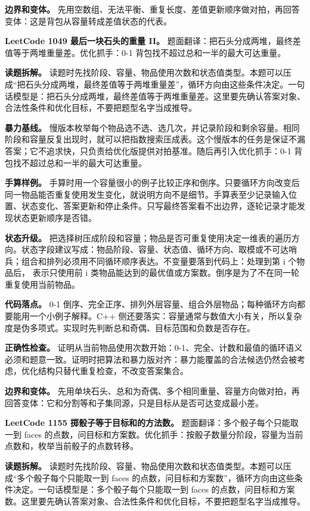 \textbf{边界和变体。} 先用空数组、无法平衡、重复长度、差值更新顺序做对拍，再回答变体：这是背包从容量转成差值状态的代表。

\noindent\textbf{LeetCode 1049 最后一块石头的重量 II。} 题面翻译：把石头分成两堆，最终差值等于两堆重量差。优化抓手：0-1 背包找不超过总和一半的最大可达重量。

\textbf{读题拆解。} 读题时先找阶段、容量、物品使用次数和状态值类型。本题可以压成“把石头分成两堆，最终差值等于两堆重量差”，循环方向由这些条件决定。一句话模型是：把石头分成两堆，最终差值等于两堆重量差。这里要先确认答案对象、合法性条件和优化目标，不要把题型名字当成推导。

\textbf{暴力基线。} 慢版本枚举每个物品选不选、选几次，并记录阶段和剩余容量。相同阶段和容量反复出现时，就可以把指数搜索压成表。这个慢版本的任务是保证不漏答案；它不追求快，只负责给优化版提供对拍基准。随后再引入优化抓手：0-1 背包找不超过总和一半的最大可达重量。

\textbf{手算样例。} 手算时用一个容量很小的例子比较正序和倒序。只要循环方向改变后同一物品能否重复使用发生变化，就说明方向不是细节。手算表至少记录输入位置、状态变化、答案更新和停止条件。只写最终答案看不出边界，逐轮记录才能发现状态更新顺序是否错。

\textbf{状态升级。} 把选择树压成阶段和容量；物品是否可重复使用决定一维表的遍历方向。状态字段建议写成：物品阶段、容量、状态值、循环方向、取模或不可达哨兵；组合和排列必须用不同循环顺序表达。不变量要落到代码上：处理到第 i 个物品后， 表示只使用前 i 类物品能达到的最优值或方案数。倒序是为了不在同一轮重复使用当前物品。

\textbf{代码落点。} 0-1 倒序、完全正序、排列外层容量、组合外层物品；每种循环方向都要能用一个小例子解释。C++ 侧还要落实：容量通常与数值大小有关，所以复杂度是伪多项式。实现时先判断总和奇偶、目标范围和负数是否存在。

\textbf{正确性检查。} 证明从当前物品使用次数开始：0-1、完全、计数和最值的循环语义必须和题意一致。证明时把算法和暴力版对齐：暴力能覆盖的合法候选仍然会被考虑，优化结构只替代重复检查，不改变答案集合。

\textbf{边界和变体。} 先用单块石头、总和为奇偶、多个相同重量、容量方向做对拍，再回答变体：它和分割等和子集同源，只是目标从是否可达变成最小差。

\noindent\textbf{LeetCode 1155 掷骰子等于目标和的方法数。} 题面翻译：多个骰子每个只能取一到 faces 的点数，问目标和方案数。优化抓手：按骰子数量分阶段，容量为当前点数和，枚举当前骰子的点数转移。

\textbf{读题拆解。} 读题时先找阶段、容量、物品使用次数和状态值类型。本题可以压成“多个骰子每个只能取一到 faces 的点数，问目标和方案数”，循环方向由这些条件决定。一句话模型是：多个骰子每个只能取一到 faces 的点数，问目标和方案数。这里要先确认答案对象、合法性条件和优化目标，不要把题型名字当成推导。


